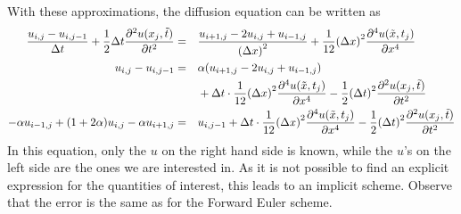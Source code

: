 \documentclass[12pt,english,a4paper]{article}
\begin{document}
With these approximations, the diffusion equation can be written as
\begin{alignat*}{2}
    \frac{u_{i,j}-u_{i,j-1}}{\Delta t} + \frac{1}{2}\Delta t\pdv[2]{u(x_j,\tilde{t})}{t}
    &=&& \frac{u_{i+1,j}  - 2u_{i,j} + u_{i-1,j}}{\qty(\Delta x)^2} + \frac{1}{12}\qty(\Delta x)^2\pdv[4]{u(\tilde{x},t_j)}{x}  \\
    u_{i,j}-u_{i,j-1} &=&& \alpha(u_{i+1,j}  - 2u_{i,j} + u_{i-1,j})\\
    &&& + \Delta t\cdot \frac{1}{12}\qty(\Delta x)^2\pdv[4]{u(\tilde{x},t_j)}{x}  - \frac{1}{2}\qty(\Delta t)^2\pdv[2]{u(x_j,\tilde{t})}{t}\\
    -\alpha u_{i-1,j} + \qty(1+2\alpha)u_{i,j} - \alpha u_{i+1,j} &=&& u_{i,j-1} + \Delta t\cdot \frac{1}{12}\qty(\Delta x)^2\pdv[4]{u(\tilde{x},t_j)}{x}  - \frac{1}{2}\qty(\Delta t)^2\pdv[2]{u(x_j,\tilde{t})}{t}
\end{alignat*}
In this equation, only the \(u\) on the right hand side is known, while the \(u\)'s on the left side are the ones we are interested in. As it is not possible to find an explicit expression for the quantities of interest, this leads to an implicit scheme. Observe that the error is the same as for the Forward Euler scheme.
\end{document}
